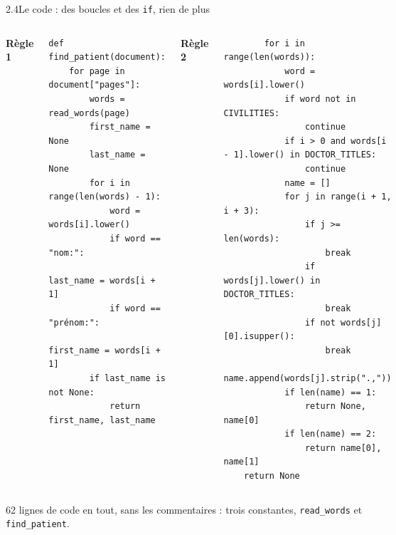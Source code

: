 \documentclass[11pt,aspectratio=169]{beamer}
\newcommand{\tok}[1]{\foreignlanguage{english}{\texttt{#1}}}
\begin{document}
\begin{frame}[fragile]{2.4\quad Le code : des boucles et des \tok{if}, rien de plus}
  \begin{columns}[T]
    \textbf{Règle 1}\par\smallskip
    \begin{otherlanguage}{english}
\begin{lstlisting}
def find_patient(document):
    for page in document["pages"]:
        words = read_words(page)
        first_name = None
        last_name = None
        for i in range(len(words) - 1):
            word = words[i].lower()
            if word == "nom:":
                last_name = words[i + 1]
            if word == "prénom:":
                first_name = words[i + 1]
        if last_name is not None:
            return first_name, last_name
\end{lstlisting}
    \end{otherlanguage}
    \textbf{Règle 2}\par\smallskip
    \begin{otherlanguage}{english}
\begin{lstlisting}
        for i in range(len(words)):
            word = words[i].lower()
            if word not in CIVILITIES:
                continue
            if i > 0 and words[i - 1].lower() in DOCTOR_TITLES:
                continue
            name = []
            for j in range(i + 1, i + 3):
                if j >= len(words):
                    break
                if words[j].lower() in DOCTOR_TITLES:
                    break
                if not words[j][0].isupper():
                    break
                name.append(words[j].strip(".,"))
            if len(name) == 1:
                return None, name[0]
            if len(name) == 2:
                return name[0], name[1]
    return None
\end{lstlisting}
    \end{otherlanguage}
  \end{columns}

  \vspace{0.5em}
  \footnotesize
  62 lignes de code en tout, sans les commentaires : trois constantes, \tok{read\_words}
  et \tok{find\_patient}.
\end{frame}
\end{document}
